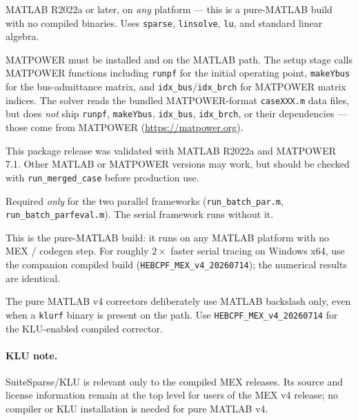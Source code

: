 \documentclass[11pt,a4paper]{article}
\newcommand{\code}[1]{\texttt{#1}}
\begin{document}
\begin{description}[leftmargin=0em,style=nextline]
\item[MATLAB (required).] MATLAB R2022a or later, on \emph{any} platform --- this is a
      pure-MATLAB build with no compiled binaries. Uses \code{sparse}, \code{linsolve},
      \code{lu}, and standard linear algebra.
\item[MATPOWER (required).] MATPOWER must be installed and on the MATLAB path. The setup
      stage calls MATPOWER functions including \code{runpf} for the initial operating
      point, \code{makeYbus} for the bus-admittance matrix, and
      \code{idx_bus}/\code{idx_brch} for MATPOWER matrix indices. The solver reads the
      bundled MATPOWER-format \code{caseXXX.m} data files, but does \emph{not} ship
      \code{runpf}, \code{makeYbus}, \code{idx_bus}, \code{idx_brch}, or their
      dependencies --- those come from MATPOWER (\url{https://matpower.org}).
\item[Validated setup.] This package release was validated with MATLAB R2022a and
      MATPOWER 7.1. Other MATLAB or MATPOWER versions may work, but should be checked with
      \code{run_merged_case} before production use.
\item[Parallel Computing Toolbox (optional).] Required \emph{only} for the two parallel
      frameworks (\code{run_batch_par.m}, \code{run_batch_parfeval.m}). The serial
      framework runs without it.
\item[No compiler needed.] This is the pure-MATLAB build: it runs on any MATLAB platform
      with no MEX / codegen step. For roughly $2\times$ faster serial tracing on Windows
      x64, use the companion compiled build (\code{HEBCPF_MEX_v4_20260714}); the numerical
      results are identical.
\item[KLU is not used in this release.] The pure MATLAB v4 correctors deliberately use
      MATLAB backslash only, even when a \code{klurf} binary is present on the path. Use
      \code{HEBCPF_MEX_v4_20260714} for the KLU-enabled compiled corrector.
\end{description}

\paragraph{KLU note.}
SuiteSparse/KLU is relevant only to the compiled MEX releases. Its source and license
information remain at the top level for users of the MEX v4 release; no compiler or KLU
installation is needed for pure MATLAB v4.
\end{document}
